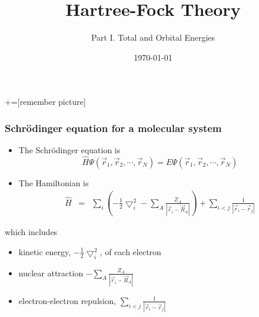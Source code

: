 \documentclass[handout]{beamer} %
\author[]{Part I.   Total and Orbital Energies}
\title[Hartree Fock Theory]{Hartree-Fock Theory}
\date[\today]{\today}
\begin{document}

+=[remember picture]

\everymath{\displaystyle}

\frame{\titlepage}

\begin{frame}
\frametitle{Schr\"{o}dinger equation for a molecular system}

\begin{itemize}
\item \small{The Schr\"{o}dinger equation is}
\begin{equation*}
\hat{H} \Psi(\vec{r}_1, \vec{r}_2, \cdots, \vec{r}_N)  = E \Psi(\vec{r}_1, \vec{r}_2, \cdots, \vec{r}_N)  
\end{equation*}
\item The Hamiltonian is
\begin{eqnarray*}
\hat{H} & = &  \sum_i \left(- \frac{1}{2} \bigtriangledown_i^2  - \sum_A \frac{Z_A}{\left| \vec{r}_i - \vec{R}_A \right| } \right) +  \sum_{i < j} \frac{1}{\left| \vec{r}_{i} - \vec{r}_j \right| }   \end{eqnarray*}
\end{itemize}
which includes 
\begin{itemize}
\item \small{kinetic energy, $- \frac{1}{2} \bigtriangledown_i^2$, of each electron}
\item nuclear attraction $- \sum_A \frac{Z_A}{\left| \vec{r}_i - \vec{R}_A \right| } $
\item electron-electron repulsion, $ \sum_{i < j} \frac{1}{\left| \vec{r}_{i} - \vec{r}_j \right| } $ 
\end{itemize}
\end{frame}
\end{document}
